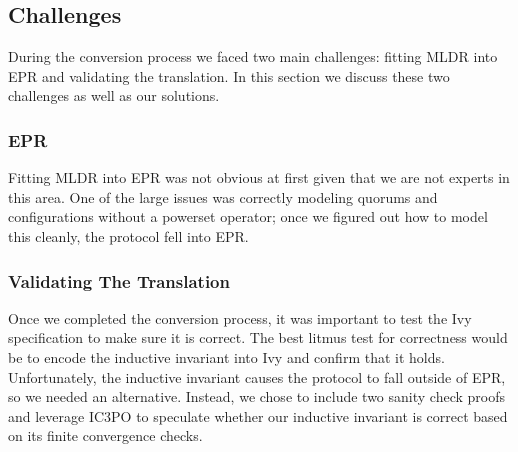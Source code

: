 \documentclass[12pt]{article}
\begin{document}
\subsection{Challenges}

During the conversion process we faced two main challenges: fitting MLDR into EPR and validating the translation.  In this section we discuss these two challenges as well as our solutions.

\subsubsection{EPR}
\label{sec:mldr-epr}



Fitting MLDR into EPR was not obvious at first given that we are not experts in this area.  One of the large issues was correctly modeling quorums and configurations without a powerset operator; once we figured out how to model this cleanly, the protocol fell into EPR.

\subsubsection{Validating The Translation}


Once we completed the conversion process, it was important to test the Ivy specification to make sure it is correct.  The best litmus test for correctness would be to encode the inductive invariant into Ivy and confirm that it holds.  Unfortunately, the inductive invariant causes the protocol to fall outside of EPR, so we needed an alternative.  Instead, we chose to include two sanity check proofs and leverage IC3PO to speculate whether our inductive invariant is correct based on its finite convergence checks.
\end{document}
